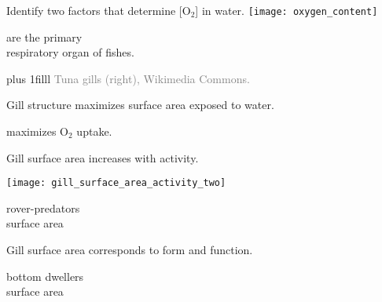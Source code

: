 \documentclass[t]{beamer}
\begin{document}
\begin{frame}[t,plain]{Identify two factors that determine [O$_2$] in water.}
	\centering
	\texttt{[image: oxygen\_content]}
\end{frame}

{
\begin{frame}[t,plain]
\hangpara\hspace{17em}  are the primary\\ 
	\hspace{17em} respiratory organ of fishes.

\vskip0pt plus 1filll
\hfill\tiny\textcolor{gray}{Tuna gills (right), Wikimedia Commons.}
\end{frame}
}

{
\begin{frame}[t,plain]{Gill structure maximizes surface area exposed to water.}

\end{frame}
}

{
\begin{frame}[t,plain]{ maximizes O$_2$ uptake.}

\end{frame}
}

{
\begin{frame}[t,plain]{Gill surface area increases with activity.}

\end{frame}
}



\begin{frame}[t,plain]
\begin{minipage}{0.55\textwidth}
	\texttt{[image: gill\_surface\_area\_activity\_two]}
\end{minipage}\hfill
\begin{minipage}{0.40\textwidth}
	\raggedright
	{\parbox{\widthof{active rover-predators}}{\footnotesize{} rover-predators\\ surface area}}

	\vspace{5em}

	{\hangpara\hspace{17em} Gill surface area corresponds to form and function.}

	\vspace{7em}

	{\parbox{\widthof{sluggish rover-predators}}{\footnotesize{} bottom dwellers\\ surface area}}

\end{minipage}
\end{frame}
\end{document}

